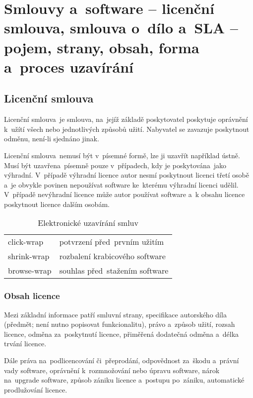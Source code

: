 
\clearpage
\section{Smlouvy a~software -- licenční smlouva, smlouva o~dílo a~SLA -- pojem, strany, obsah, forma a~proces uzavírání}

\subsection{Licenční smlouva}

Licenční smlouva~je smlouva, na~jejíž základě poskytovatel poskytuje oprávnění k~užítí všech nebo jednotlivých způsobů užití. Nabyvatel se zavazuje poskytnout odměnu, není-li sjednáno jinak.

Licenční smlouva~nemusí být v~písemné formě, lze ji uzavřít například ústně. Musí být uzavřena~písemně pouze v~případech, kdy je poskytována~jako výhradní. V~případě výhradní licence autor nesmí poskytnout licenci třetí osobě a~je obvykle povinen nepoužívat software ke~kterému výhradní licenci udělil. V~případě nevýhradní licence může autor používat software a~k obsahu licence poskytnout licence dalším osobám.

\begin{table}[ht]
	\centering
	\caption{Elektronické uzavírání smluv}
	\begin{tabular}{l|l}
		click-wrap  & potvrzení před~prvním užitím   \\
		shrink-wrap & rozbalení krabicového software \\
		browse-wrap & souhlas před~stažením software \\
	\end{tabular}
\end{table}

\subsubsection{Obsah licence}

Mezi základní informace patří smluvní strany, specifikace autorského díla (předmět; není nutno popisovat funkcionalitu), právo a~způsob užití, rozsah licence, odměna za~poskytnutí licence, přiměřená dodatečná odměna a~délka trvání licence.

Dále práva na~podlicencování či~přeprodání, odpovědnost za~škodu a~právní vady software, oprávnění k~rozmnožování nebo úpravu software, nárok na~upgrade software, způsob zániku licence a~postupu po~zániku, automatické prodlužování licence.

